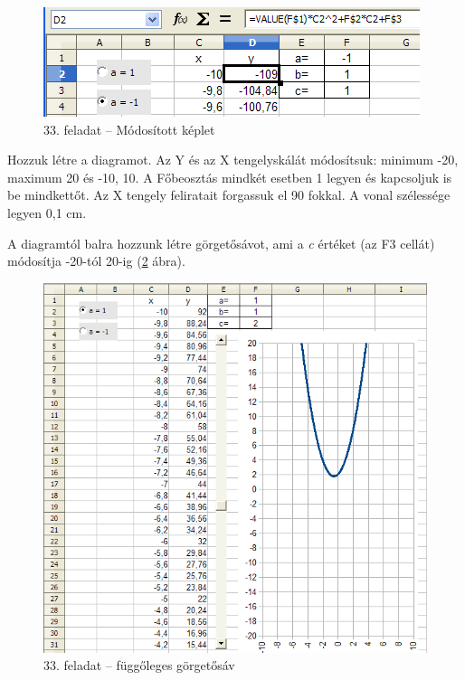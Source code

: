 \begin{figure}[!h]
\begin{center}
\includegraphics[width=11.005cm]{oocalcv1-img154.png}
\caption{33. feladat -- Módosított képlet}\label{33-feladatMódosított}
\end{center}
\end{figure}

Hozzuk létre a diagramot. Az Y és az X tengelyskálát
módosítsuk: minimum -20, maximum 20 és -10, 10. A
Főbeosztás mindkét esetben 1 legyen és kapcsoljuk is be
mindkettőt. Az X tengely feliratait forgassuk el 90 fokkal. A vonal
szélessége legyen 0,1 cm. 

A diagramtól balra hozzunk létre görgetősávot, ami a
\textit{c} értéket (az F3 cellát) módosítja -20-tól 20-ig
(\ref{33-feladatGörgetősáv} ábra).

\begin{figure}[!h]
\begin{center}
\includegraphics[width=14.9cm]{oocalcv1-img155.png}
\caption{33. feladat -- függőleges görgetősáv} \label{33-feladatGörgetősáv}
\end{center}
\end{figure}


